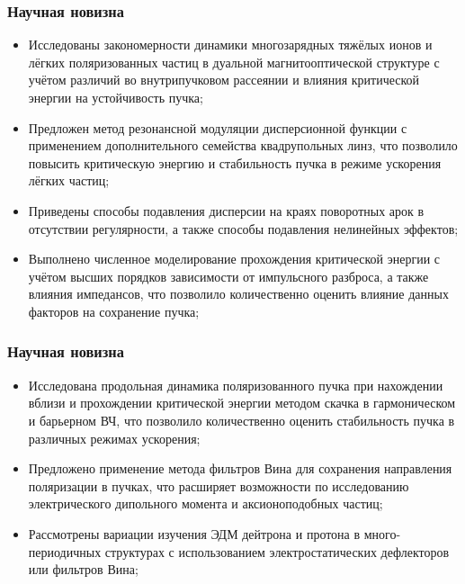 \begin{frame}
	\frametitle{Научная новизна}
	\begin{itemize}
		\item	Исследованы закономерности динамики многозарядных тяжёлых ионов и лёгких поляризованных частиц в дуальной магнитооптической структуре с учётом различий во внутрипучковом рассеянии и влияния критической энергии на устойчивость пучка;
		\vspace{1em}
		\item 	Предложен метод резонансной модуляции дисперсионной функции с применением дополнительного семейства квадрупольных линз, что позволило повысить критическую энергию и стабильность пучка в режиме ускорения лёгких частиц;
		\vspace{1em}
		\item	Приведены способы подавления дисперсии на краях поворотных арок в отсутствии регулярности, а также способы подавления нелинейных эффектов;
		\vspace{1em}
		\item 	Выполнено численное моделирование прохождения критической энергии с учётом высших порядков зависимости от импульсного разброса, а также влияния импедансов, что позволило количественно оценить влияние данных факторов на сохранение пучка;
	\end{itemize}
	
\end{frame}
\begin{frame}
	\frametitle{Научная новизна}
	\begin{itemize}
		\item	Исследована продольная динамика поляризованного пучка при нахождении вблизи и прохождении критической энергии методом скачка в гармоническом и барьерном ВЧ, что позволило количественно оценить стабильность пучка в различных режимах ускорения;
		\vspace{1em}
		\item	Предложено применение метода фильтров Вина для сохранения направления поляризации в пучках, что расширяет возможности по исследованию электрического дипольного момента и аксионоподобных частиц;
		\vspace{1em}
		\item	Рассмотрены вариации изучения ЭДМ дейтрона и протона в много-периодичных структурах с использованием электростатических дефлекторов или фильтров Вина;
	\end{itemize}
\end{frame}

